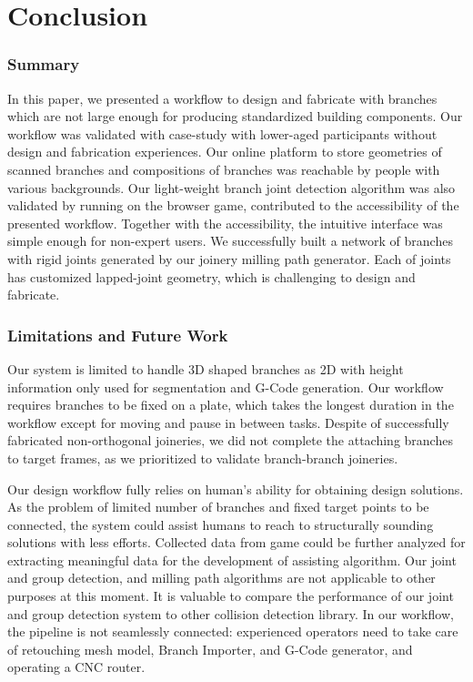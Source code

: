 \section{Conclusion}
\subsubsection*{Summary}
In this paper, we presented a workflow to design and fabricate with branches which are not large enough for producing standardized building components.
Our workflow was validated with case-study with lower-aged participants without design and fabrication experiences.
Our online platform to store geometries of scanned branches and compositions of branches was reachable by people with various backgrounds. %
Our light-weight branch joint detection algorithm was also validated by running on the browser game, contributed to the accessibility of the presented workflow.
Together with the accessibility, the intuitive interface was simple enough for non-expert users.
We successfully built a network of branches with rigid joints generated by our joinery milling path generator.
Each of joints has customized lapped-joint geometry, which is challenging to design and fabricate.

\subsubsection*{Limitations and Future Work}
Our system is limited to handle 3D shaped branches as 2D with height information only used for segmentation and G-Code generation.
Our workflow requires branches to be fixed on a plate, which takes the longest duration in the workflow except for moving and pause in between tasks.
Despite of successfully fabricated non-orthogonal joineries, we did not complete the attaching branches to target frames, as we prioritized to validate branch-branch joineries.

Our design workflow fully relies on human's ability for obtaining design solutions.
As the problem of limited number of branches and fixed target points to be connected, the system could assist humans to reach to structurally sounding solutions with less efforts.
Collected data from game could be further analyzed for extracting meaningful data for the development of assisting algorithm.
Our joint and group detection, and milling path algorithms are not applicable to other purposes at this moment.
It is valuable to compare the performance of our joint and group detection system to other collision detection library.
In our workflow, the pipeline is not seamlessly connected: experienced operators need to take care of retouching mesh model, Branch Importer, and G-Code generator, and operating a CNC router.
